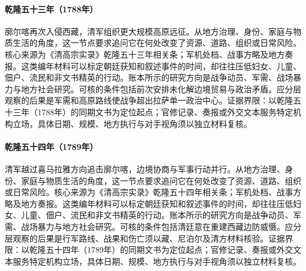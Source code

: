 \hypertarget{social:EQ-1788-SECOND-GURKHA-WAR}{}\paragraph{乾隆五十三年（1788年）}廓尔喀再次入侵西藏，清军组织更大规模高原远征。从地方治理、身份、家庭与物质生活的角度，这一节点要求追问它在何处改变了资源、道路、组织或日常风险。核心来源为《清高宗实录》乾隆五十三年相关条；军机处档、战事方略及地方奏报。这类编年材料可以标定朝廷获知和叙述事件的时间，却往往压低妇女、儿童、佃户、流民和非文书精英的行动。账本所示的研究方向是战争动员、军需、战场暴力与地方社会研究。可核的条件包括前次安排未化解边境贸易与政治矛盾。应分层观察的后果是军需和高原路线使战争超出拉萨单一政治中心。证据界限：以乾隆五十三年（1788年）的同期文书为定位起点；官修记录、奏报或外交文本服务特定机构立场，具体日期、规模、地方执行与对手视角须以独立材料复核。
\hypertarget{social:EQ-1789-TIBET-NEPAL-CAMPAIGN}{}\paragraph{乾隆五十四年（1789年）}清军越过喜马拉雅方向追击廓尔喀，边境协商与军事行动并行。从地方治理、身份、家庭与物质生活的角度，这一节点要求追问它在何处改变了资源、道路、组织或日常风险。核心来源为《清高宗实录》乾隆五十四年相关条；军机处档、战事方略及地方奏报。这类编年材料可以标定朝廷获知和叙述事件的时间，却往往压低妇女、儿童、佃户、流民和非文书精英的行动。账本所示的研究方向是战争动员、军需、战场暴力与地方社会研究。可核的条件包括清廷意在重建西藏边防威慑。应分层观察的后果是行军路线、战果和伤亡须以藏、尼泊尔及清方材料核验。证据界限：以乾隆五十四年（1789年）的同期文书为定位起点；官修记录、奏报或外交文本服务特定机构立场，具体日期、规模、地方执行与对手视角须以独立材料复核。
